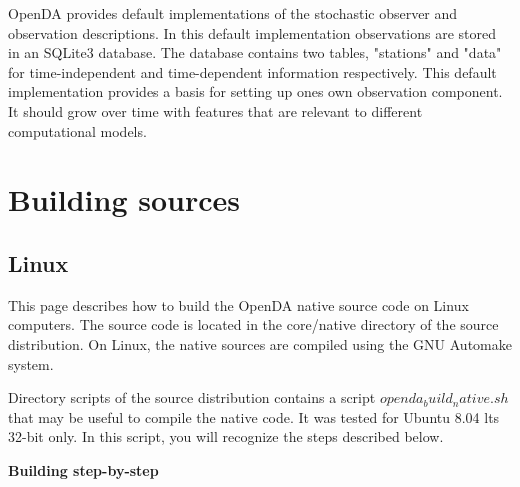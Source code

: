 OpenDA provides default implementations of the stochastic observer and observation descriptions. In this default implementation observations are stored in an SQLite3 database. The database contains two tables, "stations" and "data" for time-independent and time-dependent information respectively. This default implementation provides a basis for setting up ones own observation component. It should grow over time with features that are relevant to different computational models. 

\section{Building sources}

\subsection{Linux}

This page describes how to build the OpenDA native source code on Linux computers. The source code is located in the core/native directory of the source distribution. On Linux, the native sources are compiled using the GNU Automake system.

Directory scripts of the source distribution contains a script $openda_build_native.sh$ that may be useful to compile the native code. It was tested for Ubuntu 8.04 lts 32-bit only. In this script, you will recognize the steps described below.

\textbf{Building step-by-step}

